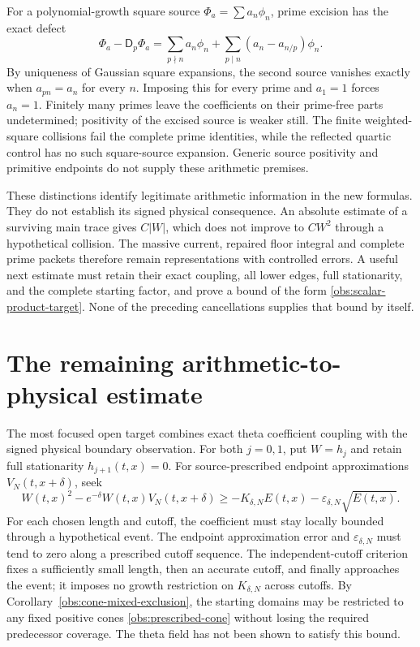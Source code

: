 \documentclass[11pt]{article}
\numberwithin{equation}{section}
\theoremstyle{definition}
\theoremstyle{remark}
\begin{document}
For a polynomial-growth square source $\Phi_a=\sum a_n\phi_n$,
prime excision has the exact defect
\begin{equation}
 \Phi_a-\mathsf D_p\Phi_a
 =\sum_{p\nmid n}a_n\phi_n
  +\sum_{p\mid n}(a_n-a_{n/p})\phi_n.
 \label{dil:weighted-defect}
\end{equation}
By uniqueness of Gaussian square expansions, the second source vanishes
exactly when $a_{pn}=a_n$ for every $n$. Imposing this for every prime
and $a_1=1$ forces $a_n=1$. Finitely many primes leave the coefficients
on their prime-free parts undetermined; positivity of the excised source
is weaker still. The finite weighted-square collisions fail the complete
prime identities, while the reflected quartic control has no such
square-source expansion. Generic source positivity and primitive
endpoints do not supply these arithmetic premises.

These distinctions identify legitimate arithmetic information in the
new formulas. They do not establish its signed physical consequence.
An absolute estimate of a surviving main trace gives $C|W|$, which does
not improve to $CW^2$ through a hypothetical collision. The massive
current, repaired floor integral and complete prime packets therefore
remain representations with controlled errors. A useful next estimate
must retain their exact coupling, all lower edges, full stationarity,
and the complete starting factor, and prove a bound of the form
\eqref{obs:scalar-product-target}. None of the preceding cancellations
supplies that bound by itself.

\section{The remaining arithmetic-to-physical estimate}\label{next:section}

The most focused open target combines exact theta coefficient coupling
with the signed physical boundary observation. For both
$j=0,1$, put $W=h_j$ and retain full stationarity $h_{j+1}(t,x)=0$.
For source-prescribed endpoint approximations $V_N(t,x+\delta)$, seek
\begin{equation}
 W(t,x)^2-e^{-\delta}W(t,x)V_N(t,x+\delta)
 \ge-K_{\delta,N}E(t,x)
       -\varepsilon_{\delta,N}\sqrt{E(t,x)}.
 \label{next:chord-target}
\end{equation}
For each chosen length and cutoff, the coefficient must stay locally
bounded through a hypothetical event. The endpoint approximation error
and $\varepsilon_{\delta,N}$ must tend to zero along a prescribed
cutoff sequence. The independent-cutoff criterion fixes a sufficiently
small length, then an accurate cutoff, and finally approaches the event;
it imposes no growth restriction on $K_{\delta,N}$ across cutoffs.
By Corollary~\ref{obs:cone-mixed-exclusion}, the starting domains may
be restricted to any fixed positive cones \eqref{obs:prescribed-cone}
without losing the required predecessor coverage. The theta field has
not been shown to satisfy this bound.
\end{document}
